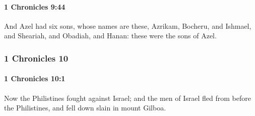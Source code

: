		\paragraph{1 Chronicles 9:44} %
			\label{1CHRONICLES-9-44}

			And Azel had six sons, whose names are these, Azrikam, Bocheru, and Ishmael, and Sheariah, and Obadiah, and Hanan: these were the sons of Azel.

	\subsubsection{1 Chronicles 10} %
		\label{1CHRONICLES-10}

		\paragraph{1 Chronicles 10:1} %
			\label{1CHRONICLES-10-1}

			Now the Philistines fought against Israel; and the men of Israel fled from before the Philistines, and fell down slain in mount Gilboa.

